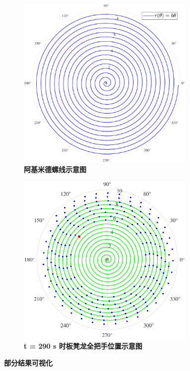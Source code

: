\documentclass[zihao=-4, UTF8]{article}		%
\theoremstyle{MyLineTheoremStyle} %
\theoremstyle{MyBlockTheoremStyle} %
\theoremstyle{MySubsubsectionStyle} %
\begin{document}
\begin{figure}[H]\centering
\begin{subfigure}[t]{0.47\textwidth}\centering
    \includegraphics[width=0.95\textwidth]{assets/ajmd.pdf}
    \caption{\bfseries 阿基米德螺线示意图 }
\end{subfigure}\begin{subfigure}[t]{0.47\textwidth}\centering
    \includegraphics[width=0.95\textwidth]{assets/t1circle.pdf}
    \caption{\bfseries t = 290 s 时板凳龙全把手位置示意图 }
\end{subfigure}
\caption{\bfseries 部分结果可视化 }\label{部分结果可视化}
\end{figure}
\end{document}

